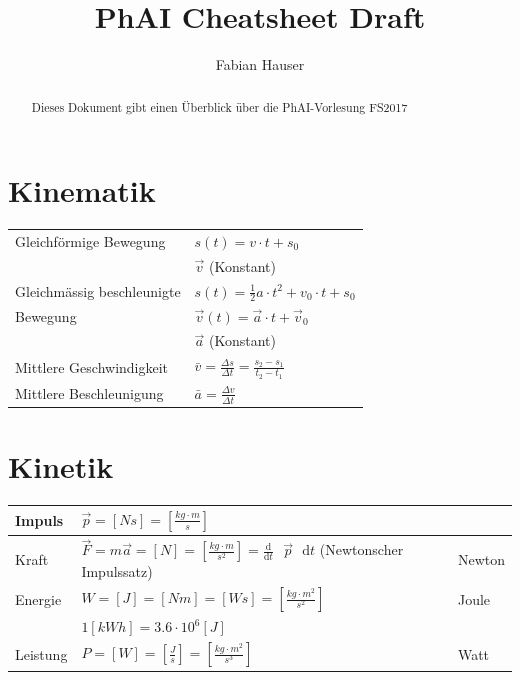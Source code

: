\documentclass[a4paper]{scrartcl}
\title{PhAI Cheatsheet Draft}
\author{Fabian Hauser}
\newcommand{\abl}[2]{\frac{\text{d}}{\text{d}#2}\text{ } #1 \text{ }\mathrm{d}t}
\begin{document}
\maketitle

\begin{abstract}
	Dieses Dokument gibt einen Überblick über die PhAI-Vorlesung FS2017
\end{abstract}


\section{Kinematik}
	\begin{tabu} {l X}
		\hline
		Gleichförmige Bewegung
		&	$s(t) = v \cdot t + s_0$ 
		\\
		&	$\vec{v}$ (Konstant)
		\\ \hline
		Gleichmässig beschleunigte
		&	$s(t) = \frac{1}{2} a \cdot t^2 + v_0 \cdot t + s_0$
		\\
		Bewegung
		&	$\vec{v}(t) = \vec{a} \cdot t + \vec{v}_0$
		\\
		&	$\vec{a}$ (Konstant)
		\\ \hline
		Mittlere Geschwindigkeit
		&	$\bar{v} = \frac{\Delta s}{\Delta t} = \frac{s_2 - s_1}{t_2 - t_1}$
		\\ \hline
		Mittlere Beschleunigung
		&	$\bar{a} = \frac{\Delta v}{\Delta t}$ 
		\\ \hline
	\end{tabu}

\section{Kinetik}
	\begin{tabu} {l X l}
		\hline
		Impuls
		&	$\vec{p} = \left[ Ns \right] = \left[ \frac{kg \cdot m}{s} \right]$	%
		& 
		\\ \hline
		Kraft
		&	$\vec{F}=m\vec{a} = \left[ N \right] = \left[ \frac{kg \cdot m}{s^2} \right] = \abl{\vec{p}}{t}$ (Newtonscher Impulssatz) %
		&	Newton
		\\ \hline
		Energie
		&	$W = \left[ J \right] = \left[ N m \right] = \left[ Ws \right] = \left[ \frac{kg \cdot m^2}{s^2} \right]$
		&	Joule
		\\
		&	$1 \left[kWh\right] = 3.6 \cdot 10^6 \left[ J \right]$
		&
		\\ \hline
		Leistung
		&	$P = \left[ W \right] = \left[ \frac{J}{s} \right] = \left[ \frac{kg \cdot m^2}{s^3} \right]$
		&	Watt
		\\ \hline
	\end{tabu}
	
\end{document}
